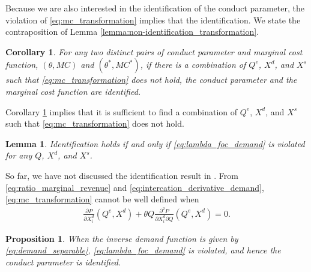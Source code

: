 \documentclass[11pt, a4paper]{article}
\newtheorem{lemma}{Lemma}
\newtheorem{proposition}{Proposition}
\newtheorem{corollary}{Corollary}
\theoremstyle{remark}
\begin{document}
Because we are also interested in the identification of the conduct parameter, the violation of \eqref{eq:mc_transformation} implies that the identification.
We state the contraposition of Lemma \ref{lemma:non-identification_transformation}.
\begin{corollary}\label{corollary:identification}
    For any two distinct pairs of conduct parameter and marginal cost function, $(\theta, MC)$ and $(\theta^{*}, MC^{*})$, if there is a combination of $Q^e$, $X^{d}$, and $X^{s}$ such that \eqref{eq:mc_transformation} does not hold, the conduct parameter and the marginal cost function are identified.
\end{corollary}


Corollary \ref{corollary:identification} implies that it is sufficient to find a combination of $Q^e$, $X^{d}$, and $X^{s}$ such that \eqref{eq:mc_transformation} does not hold.



\begin{lemma}
    Identification holds if and only if \eqref{eq:lambda_foc_demand} is violated for any $Q$, $X^{d}$, and $X^{s}$.
\end{lemma}






So far, we have not discussed the identification result in \citet{lau1982identifying}.
From \eqref{eq:ratio_marginal_revenue} and \eqref{eq:intercation_derivative_demand}, \eqref{eq:mc_transformation} cannot be well defined when 
\begin{align}
    \frac{\partial P}{\partial X^{d}_i}(Q^e, X^{d}) + \theta Q\frac{\partial^2 P}{\partial X^{d}_{i}\partial Q}(Q^e, X^{d}) = 0.
\end{align}







\begin{proposition}
    When the inverse demand function is given by \eqref{eq:demand_separable}, \eqref{eq:lambda_foc_demand} is violated, and hence the conduct parameter is identified.
\end{proposition}
\end{document}
